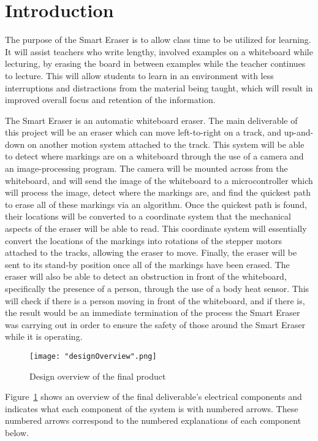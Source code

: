  \section{Introduction}
 The purpose of the Smart Eraser is to allow class time to be utilized for learning. It will assist teachers who write lengthy, involved examples on a whiteboard while lecturing, by erasing the board in between examples while the teacher continues to lecture. This will allow students to learn in an environment with less interruptions and distractions from the material being taught, which will result in improved overall focus and retention of the information.  
 \par
\setlength{\parindent}{2.5ex}The Smart Eraser is an automatic whiteboard eraser. The main deliverable of  this project will be an eraser which can move left-to-right on a track, and up-and-down on another motion system attached to the track. This system will be able to detect where markings are on a whiteboard through the use of a camera and an image-processing program. The camera will be mounted across from the whiteboard, and will send the image of the whiteboard to a microcontroller which will process the image, detect where the markings are, and find the quickest path to erase all of these markings via an algorithm. Once the quickest path is found, their locations will be converted to a coordinate system that the mechanical aspects of the eraser will be able to read. This coordinate system will essentially convert the locations of the markings into rotations of the stepper motors attached to the tracks, allowing the eraser to move. Finally, the eraser will be sent to its stand-by position once all of the markings have been erased. The eraser will also be able to detect an obstruction in front of the whiteboard, specifically the presence of a person, through the use of a body heat sensor. This will check if there is a person moving in front of the whiteboard, and if there is, the result would be an immediate termination of the process the Smart Eraser was carrying out in order to ensure the safety of those around the Smart Eraser while it is operating.
 \par

\begin{figure}[H]
	\centering
	{\texttt{[image: "designOverview".png]}}
	\caption{Design overview of the final product}
	\label{fig:rough}
\end{figure}

Figure~\ref{fig:rough} shows an overview of the final deliverable's electrical components and indicates what each component of the system is with numbered arrows. These numbered arrows correspond to the numbered explanations of each component below.

